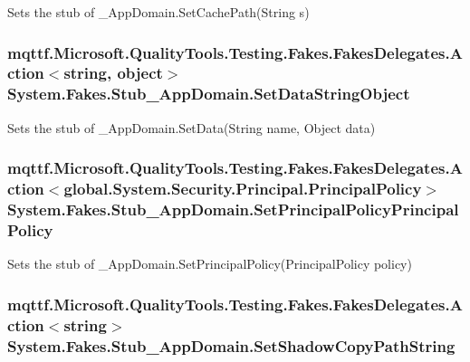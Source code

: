 Sets the stub of \-\_\-\-App\-Domain.\-Set\-Cache\-Path(\-String s)

\hypertarget{class_system_1_1_fakes_1_1_stub___app_domain_af95df0aaded37b64a13bf88e0bc773eb}{
\subsubsection[{Set\-Data\-String\-Object}]{\setlength{\rightskip}{0pt plus 5cm}mqttf.\-Microsoft.\-Quality\-Tools.\-Testing.\-Fakes.\-Fakes\-Delegates.\-Action$<$string, object$>$ System.\-Fakes.\-Stub\-\_\-\-App\-Domain.\-Set\-Data\-String\-Object}}\label{class_system_1_1_fakes_1_1_stub___app_domain_af95df0aaded37b64a13bf88e0bc773eb}


Sets the stub of \-\_\-\-App\-Domain.\-Set\-Data(\-String name, Object data)

\hypertarget{class_system_1_1_fakes_1_1_stub___app_domain_aa03336534597d578cd9bf4037fc230fb}{
\subsubsection[{Set\-Principal\-Policy\-Principal\-Policy}]{\setlength{\rightskip}{0pt plus 5cm}mqttf.\-Microsoft.\-Quality\-Tools.\-Testing.\-Fakes.\-Fakes\-Delegates.\-Action$<$global.\-System.\-Security.\-Principal.\-Principal\-Policy$>$ System.\-Fakes.\-Stub\-\_\-\-App\-Domain.\-Set\-Principal\-Policy\-Principal\-Policy}}\label{class_system_1_1_fakes_1_1_stub___app_domain_aa03336534597d578cd9bf4037fc230fb}


Sets the stub of \-\_\-\-App\-Domain.\-Set\-Principal\-Policy(\-Principal\-Policy policy)

\hypertarget{class_system_1_1_fakes_1_1_stub___app_domain_a1caf2de1a0e4c69be0352a5208795cd0}{
\subsubsection[{Set\-Shadow\-Copy\-Path\-String}]{\setlength{\rightskip}{0pt plus 5cm}mqttf.\-Microsoft.\-Quality\-Tools.\-Testing.\-Fakes.\-Fakes\-Delegates.\-Action$<$string$>$ System.\-Fakes.\-Stub\-\_\-\-App\-Domain.\-Set\-Shadow\-Copy\-Path\-String}}\label{class_system_1_1_fakes_1_1_stub___app_domain_a1caf2de1a0e4c69be0352a5208795cd0}



